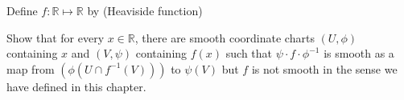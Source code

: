 Define $f:\mathbb{R}\mapsto\mathbb{R}$ by (Heaviside function)

Show that for every $x \in \mathbb{R}$, there are smooth coordinate charts $(U, \phi)$ containing $x$ and $(V, \psi)$ containing $f(x)$ such that $\psi \cdot f \cdot \phi^{-1}$ is smooth as a map from $(\phi(U \cap f^{-1}(V)))$ to $\psi(V)$ but $f$ is not smooth in the sense we have defined in this chapter.